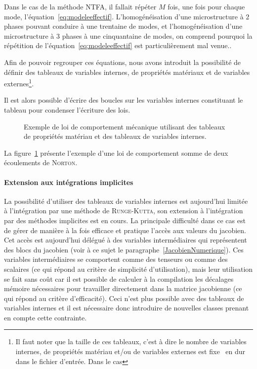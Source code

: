 \documentclass[12pt]{article}
\begin{document}
{  Dans le cas de la méthode NTFA, il fallait répéter \(M\) fois, une
  fois pour chaque mode, l'équation~\eqref{eq:modeleeffectif}.
  L'homogénéisation d'une microstructure à \(2\) phases pouvant conduire
  à une trentaine de modes, et l'homogénéisation d'une microstructure à
  \(3\) phases à une cinquantaine de modes, on comprend pourquoi la
  répétition de l'équation~\eqref{eq:modeleeffectif} est
  particulièrement mal venue.}.

Afin de pouvoir regrouper ces équations, nous avons introduit la
possibilité de définir des tableaux de variables internes, de propriétés
matériaux et de variables externes\footnote{Il faut noter que la taille
de ces tableaux, c'est à dire le nombre de variables internes, de
propriétés matériau et/ou de variables externes est fixe \og~en
dur~\fg{} dans le fichier d'entrée. Dans le cas}.

Il est alors possible d'écrire des boucles sur les variables internes
constituant le tableau pour condenser l'écriture des lois.

\begin{figure}
  {\scriptsize
    
  }
  \caption{Exemple de loi de comportement mécanique utilisant des
    tableaux de propriétés matériau et des tableaux de variables
    internes.}
  \label{2norton-rk}
\end{figure}

La figure~\ref{2norton-rk} présente l'exemple d'une loi de comportement
somme de deux écoulements de \textsc{Norton}.

\paragraph{Extension aux intégrations implicites} La possibilité
d'utiliser des tableaux de variables internes est aujourd'hui limitée à
l'intégration par une méthode de \textsc{Runge-Kutta}, son extension à
l'intégration par des méthodes implicites est en cours. La principale
difficulté dans ce cas est de gérer de manière à la fois efficace et
pratique l'accès aux valeurs du jacobien. Cet accès est aujourd'hui
délégué à des variables intermédiaires qui représentent des blocs du
jacobien (voir à ce sujet le paragraphe~\ref{JacobienNumerique}). Ces
variables intermédiaires se comportent comme des tenseurs ou comme des
scalaires (ce qui répond au critère de simplicité d'utilisation), mais
leur utilisation se fait sans coût car il est possible de calculer à la
compilation les décalages mémoire nécessaires pour travailler
directement dans la matrice jacobienne (ce qui répond au critère
d'efficacité). Ceci n'est plus possible avec des tableaux de variables
internes et il est nécessaire donc introduire de nouvelles classes
prenant en compte cette contrainte.
\end{document}
